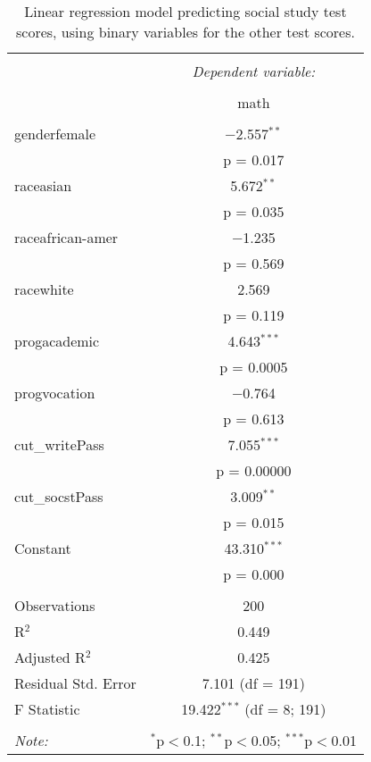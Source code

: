 
\begin{table}[!htbp] \centering 
  \caption{Linear regression model predicting social study test scores, 
          using binary variables for the other test scores.} 
  \label{tab::lm_cut_math} 
\begin{tabular}{@{\extracolsep{5pt}}lc} 
\\[-1.8ex]\hline 
\hline \\[-1.8ex] 
 & \multicolumn{1}{c}{\textit{Dependent variable:}} \\ 
\cline{2-2} 
\\[-1.8ex] & math \\ 
\hline \\[-1.8ex] 
 genderfemale & $-$2.557$^{**}$ \\ 
  & p = 0.017 \\ 
  raceasian & 5.672$^{**}$ \\ 
  & p = 0.035 \\ 
  raceafrican-amer & $-$1.235 \\ 
  & p = 0.569 \\ 
  racewhite & 2.569 \\ 
  & p = 0.119 \\ 
  progacademic & 4.643$^{***}$ \\ 
  & p = 0.0005 \\ 
  progvocation & $-$0.764 \\ 
  & p = 0.613 \\ 
  cut\_writePass & 7.055$^{***}$ \\ 
  & p = 0.00000 \\ 
  cut\_socstPass & 3.009$^{**}$ \\ 
  & p = 0.015 \\ 
  Constant & 43.310$^{***}$ \\ 
  & p = 0.000 \\ 
 \hline \\[-1.8ex] 
Observations & 200 \\ 
R$^{2}$ & 0.449 \\ 
Adjusted R$^{2}$ & 0.425 \\ 
Residual Std. Error & 7.101 (df = 191) \\ 
F Statistic & 19.422$^{***}$ (df = 8; 191) \\ 
\hline 
\hline \\[-1.8ex] 
\textit{Note:}  & \multicolumn{1}{r}{$^{*}$p$<$0.1; $^{**}$p$<$0.05; $^{***}$p$<$0.01} \\ 
\end{tabular} 
\end{table} 
